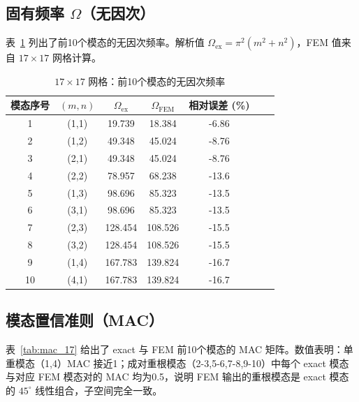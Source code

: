 \documentclass[12pt,a4paper]{article}
\begin{document}
\subsection{固有频率 $\Omega$（无因次）}
表~\ref{tab:omega_17} 列出了前10个模态的无因次频率。解析值 $\Omega_{\text{ex}} = \pi^2(m^2+n^2)$，FEM 值来自 $17\times17$ 网格计算。

\begin{table}[htbp]
\centering
\caption{$17\times17$ 网格：前10个模态的无因次频率}
\label{tab:omega_17}
\begin{tabular}{ccccccc}
\toprule
模态序号 & $(m,n)$ & $\Omega_{\text{ex}}$ & $\Omega_{\text{FEM}}$ & 相对误差 (\%) \\
\midrule
1 & (1,1) & 19.739 & 18.384 & -6.86 \\
2 & (1,2) & 49.348 & 45.024 & -8.76 \\
3 & (2,1) & 49.348 & 45.024 & -8.76 \\
4 & (2,2) & 78.957 & 68.238 & -13.6 \\
5 & (1,3) & 98.696 & 85.323 & -13.5 \\
6 & (3,1) & 98.696 & 85.323 & -13.5 \\
7 & (2,3) & 128.454 & 108.526 & -15.5 \\
8 & (3,2) & 128.454 & 108.526 & -15.5 \\
9 & (1,4) & 167.783 & 139.824 & -16.7 \\
10& (4,1) & 167.783 & 139.824 & -16.7 \\
\bottomrule
\end{tabular}
\end{table}

\subsection{模态置信准则（MAC）}
表~\ref{tab:mac_17} 给出了 exact 与 FEM 前10个模态的 MAC 矩阵。数值表明：单重模态（1,4）MAC 接近1；成对重根模态（2-3,5-6,7-8,9-10）中每个 exact 模态与对应 FEM 模态对的 MAC 均为0.5，说明 FEM 输出的重根模态是 exact 模态的 $45^\circ$ 线性组合，子空间完全一致。
\end{document}
